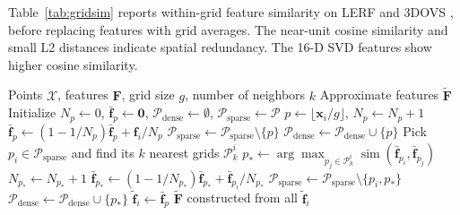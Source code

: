 \documentclass[10pt,twocolumn,letterpaper]{article}
\begin{document}
Table~\ref{tab:gridsim} reports within-grid feature similarity on LERF \cite{lerf2023} and 3DOVS \cite{liu2023weakly}, before replacing features with grid averages. The near-unit cosine similarity and small L2 distances indicate spatial redundancy. The 16-D SVD features show higher cosine similarity.




\begin{algorithm}[tb]
\caption{Grid feature aggregation.}
\label{alg:algorithm}
\begin{algorithmic}[1]
\Require Points $\mathcal{X}$, features $\mathbf{F}$, grid size $g$, number of neighbors $k$
\Ensure Approximate features $\tilde{\mathbf{F}}$
\State Initialize $N_p\gets0$, $\bar{\mathbf{f}}_p\gets\mathbf{0}$, $\mathcal{P}_{\text{dense}}\gets\emptyset$, $\mathcal{P}_{\text{sparse}}\gets\mathcal{P}$
    \State $p\gets\lfloor\mathbf{x}_i/g\rfloor$, $N_p\gets N_p+1$
    \State $\bar{\mathbf{f}}_p\gets(1-1/N_p)\bar{\mathbf{f}}_p+\mathbf{f}_i/N_p$
        \State $\mathcal{P}_{\text{sparse}}\gets\mathcal{P}_{\text{sparse}}\setminus\{p\}$
        \State $\mathcal{P}_{\text{dense}}\gets\mathcal{P}_{\text{dense}}\cup\{p\}$
    \EndIf
\EndFor
{}
    \State Pick $p_i\in\mathcal{P}_{\text{sparse}}$ and find its $k$ nearest grids $\mathcal{P}_k^i$
    \State $p_*\gets\arg\max_{p_j\in\mathcal{P}_k^i}\operatorname{sim}(\bar{\mathbf{f}}_{p_i},\bar{\mathbf{f}}_{p_j})$
    \State $N_{p_*}\gets N_{p_*}+1$
    \State $\bar{\mathbf{f}}_{p_*}\gets(1-1/N_{p_*})\bar{\mathbf{f}}_{p_*}+\bar{\mathbf{f}}_{p_i}/N_{p_*}$
    \State $\mathcal{P}_{\text{sparse}}\gets\mathcal{P}_{\text{sparse}}\setminus\{p_i,p_*\}$
    \State $\mathcal{P}_{\text{dense}}\gets\mathcal{P}_{\text{dense}}\cup\{p_*\}$
\EndWhile
{}
    \State $\tilde{\mathbf{f}}_i\gets\bar{\mathbf{f}}_p$
\EndFor
\State \Return $\tilde{\mathbf{F}}$ constructed from all $\tilde{\mathbf{f}}_i$
\end{algorithmic}
\end{algorithm}
\end{document}
